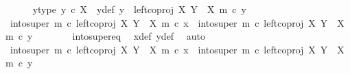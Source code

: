 \begin{isabellebody}
\ \ \ \ \isamarkupfalse%
\ y{\isacharprime}{\kern0pt}{\isacharunderscore}{\kern0pt}type{\isacharcolon}{\kern0pt}\ {\isachardoublequoteopen}y{\isacharprime}{\kern0pt}\ {\isasymin}\isactrlsub c\ X{\isachardoublequoteclose}\ \ y{\isacharunderscore}{\kern0pt}def{\isacharcolon}{\kern0pt}\ {\isachardoublequoteopen}y\ {\isacharequal}{\kern0pt}\ left{\isacharunderscore}{\kern0pt}coproj\ X\ {\isacharparenleft}{\kern0pt}Y\ {\isasymsetminus}\ {\isacharparenleft}{\kern0pt}X{\isacharcomma}{\kern0pt}\ m{\isacharparenright}{\kern0pt}{\isacharparenright}{\kern0pt}\ {\isasymcirc}\isactrlsub c\ y{\isacharprime}{\kern0pt}{\isachardoublequoteclose}\isanewline
\isanewline
\ \ \ \ \isamarkupfalse%
\ {\isachardoublequoteopen}into{\isacharunderscore}{\kern0pt}super\ m\ {\isasymcirc}\isactrlsub c\ left{\isacharunderscore}{\kern0pt}coproj\ X\ {\isacharparenleft}{\kern0pt}Y\ {\isasymsetminus}\ {\isacharparenleft}{\kern0pt}X{\isacharcomma}{\kern0pt}\ m{\isacharparenright}{\kern0pt}{\isacharparenright}{\kern0pt}\ {\isasymcirc}\isactrlsub c\ x{\isacharprime}{\kern0pt}\ {\isacharequal}{\kern0pt}\ into{\isacharunderscore}{\kern0pt}super\ m\ {\isasymcirc}\isactrlsub c\ left{\isacharunderscore}{\kern0pt}coproj\ X\ {\isacharparenleft}{\kern0pt}Y\ {\isasymsetminus}\ {\isacharparenleft}{\kern0pt}X{\isacharcomma}{\kern0pt}\ m{\isacharparenright}{\kern0pt}{\isacharparenright}{\kern0pt}\ {\isasymcirc}\isactrlsub c\ y{\isacharprime}{\kern0pt}{\isachardoublequoteclose}\isanewline
\ \ \ \ \ \ \isamarkupfalse%
\ into{\isacharunderscore}{\kern0pt}super{\isacharunderscore}{\kern0pt}eq\ \isamarkupfalse%
\ x{\isacharunderscore}{\kern0pt}def\ y{\isacharunderscore}{\kern0pt}def\ \isamarkupfalse%
\ auto\isanewline
\ \ \ \ \isamarkupfalse%
\ \isamarkupfalse%
\ {\isachardoublequoteopen}{\isacharparenleft}{\kern0pt}into{\isacharunderscore}{\kern0pt}super\ m\ {\isasymcirc}\isactrlsub c\ left{\isacharunderscore}{\kern0pt}coproj\ X\ {\isacharparenleft}{\kern0pt}Y\ {\isasymsetminus}\ {\isacharparenleft}{\kern0pt}X{\isacharcomma}{\kern0pt}\ m{\isacharparenright}{\kern0pt}{\isacharparenright}{\kern0pt}{\isacharparenright}{\kern0pt}\ {\isasymcirc}\isactrlsub c\ x{\isacharprime}{\kern0pt}\ {\isacharequal}{\kern0pt}\ {\isacharparenleft}{\kern0pt}into{\isacharunderscore}{\kern0pt}super\ m\ {\isasymcirc}\isactrlsub c\ left{\isacharunderscore}{\kern0pt}coproj\ X\ {\isacharparenleft}{\kern0pt}Y\ {\isasymsetminus}\ {\isacharparenleft}{\kern0pt}X{\isacharcomma}{\kern0pt}\ m{\isacharparenright}{\kern0pt}{\isacharparenright}{\kern0pt}{\isacharparenright}{\kern0pt}\ {\isasymcirc}\isactrlsub c\ y{\isacharprime}{\kern0pt}{\isachardoublequoteclose}\isanewline

\end{isabellebody}
